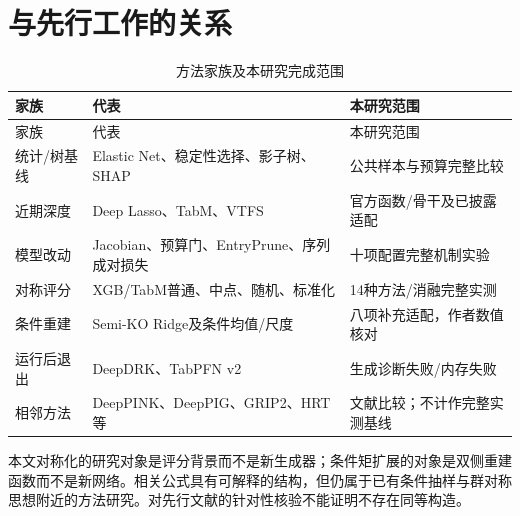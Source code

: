 \documentclass{sufethesismas}
\begin{document}
\section{与先行工作的关系}

{
\footnotesize
\begin{longtable}[]{@{}
  >{\raggedright\arraybackslash}p{}
  >{\raggedright\arraybackslash}p{}
  >{\raggedright\arraybackslash}p{}@{}}
\caption{方法家族及本研究完成范围}\tabularnewline
\toprule\noalign{}
\begin{minipage}[b]{\linewidth}\raggedright
家族
\end{minipage} & \begin{minipage}[b]{\linewidth}\raggedright
代表
\end{minipage} & \begin{minipage}[b]{\linewidth}\raggedright
本研究范围
\end{minipage} \\
\midrule\noalign{}
\endfirsthead
\toprule\noalign{}
\begin{minipage}[b]{\linewidth}\raggedright
家族
\end{minipage} & \begin{minipage}[b]{\linewidth}\raggedright
代表
\end{minipage} & \begin{minipage}[b]{\linewidth}\raggedright
本研究范围
\end{minipage} \\
\midrule\noalign{}
\endhead
\bottomrule\noalign{}
\endlastfoot
统计/树基线 & Elastic Net、稳定性选择、影子树、SHAP & 公共样本与预算完整比较 \\
近期深度 & Deep Lasso、TabM、VTFS & 官方函数/骨干及已披露适配 \\
模型改动 & Jacobian、预算门、EntryPrune、序列成对损失 & 十项配置完整机制实验 \\
对称评分 & XGB/TabM普通、中点、随机、标准化 & 14种方法/消融完整实测 \\
条件重建 & Semi-KO Ridge及条件均值/尺度 & 八项补充适配，作者数值核对 \\
运行后退出 & DeepDRK、TabPFN v2 & 生成诊断失败/内存失败 \\
相邻方法 & DeepPINK、DeepPIG、GRIP2、HRT等 & 文献比较；不计作完整实测基线 \\
\end{longtable}
}

本文对称化的研究对象是评分背景而不是新生成器；条件矩扩展的对象是双侧重建函数而不是新网络。相关公式具有可解释的结构，但仍属于已有条件抽样与群对称思想附近的方法研究。对先行文献的针对性核验不能证明不存在同等构造。
\end{document}
